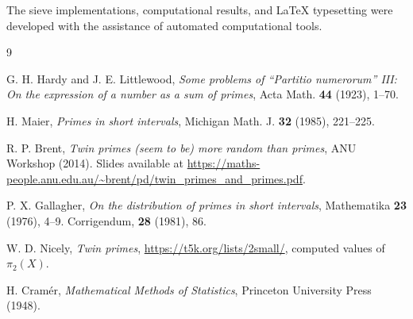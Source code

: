 \documentclass[11pt]{article}
\begin{document}
The sieve implementations, computational results, and LaTeX typesetting were developed with the assistance of automated computational tools.

\begin{thebibliography}{9}

G. H. Hardy and J. E. Littlewood,
\textit{Some problems of ``Partitio numerorum'' III: On the expression of a number as a sum of primes},
Acta Math. \textbf{44} (1923), 1--70.

H. Maier,
\textit{Primes in short intervals},
Michigan Math. J. \textbf{32} (1985), 221--225.

R. P. Brent,
\textit{Twin primes (seem to be) more random than primes},
ANU Workshop (2014). Slides available at \url{https://maths-people.anu.edu.au/~brent/pd/twin_primes_and_primes.pdf}.

P. X. Gallagher,
\textit{On the distribution of primes in short intervals},
Mathematika \textbf{23} (1976), 4--9. Corrigendum, \textbf{28} (1981), 86.

W. D. Nicely,
\textit{Twin primes},
\url{https://t5k.org/lists/2small/}, computed values of $\pi_2(X)$.

H. Cram\'{e}r,
\textit{Mathematical Methods of Statistics},
Princeton University Press (1948).

\end{thebibliography}
\end{document}
